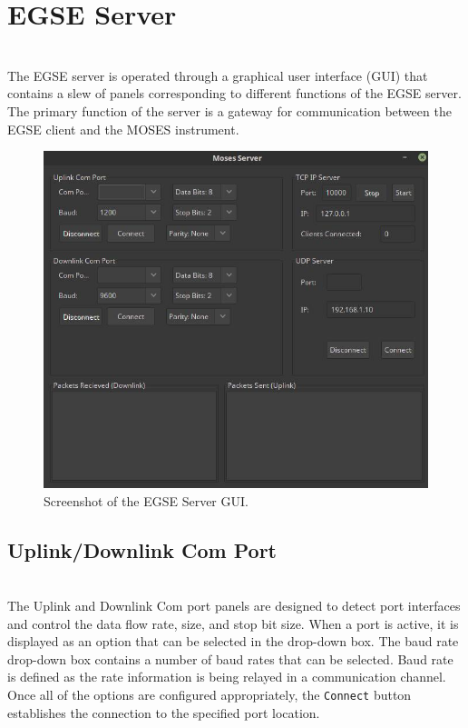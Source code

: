 \documentclass[11pt,titlepage]{article}
\begin{document}
\newpage

\section{EGSE Server}
\hrulefill
\\
The EGSE server is operated through a graphical user interface (GUI) that contains a slew of panels corresponding to different functions of the EGSE server. The primary function of the server is a gateway for communication between the EGSE client and the MOSES instrument.
\begin{figure}[h]
	\includegraphics[width=\textwidth]{EGSE_server_image}
	\caption{Screenshot of the EGSE Server GUI.}
\end{figure}


	\subsection{Uplink/Downlink Com Port}
	\hrulefill
	\\
	The Uplink and Downlink Com port panels are designed to detect port interfaces and control the data flow rate, size, and stop bit size. When a port is active, it is displayed as an option that can be selected in the drop-down box. The baud rate drop-down box contains a number of baud rates that can be selected. Baud rate is defined as the rate information is being relayed in a communication channel. Once all of the options are configured appropriately, the \texttt{Connect} button establishes the connection to the specified port location.
\end{document}
